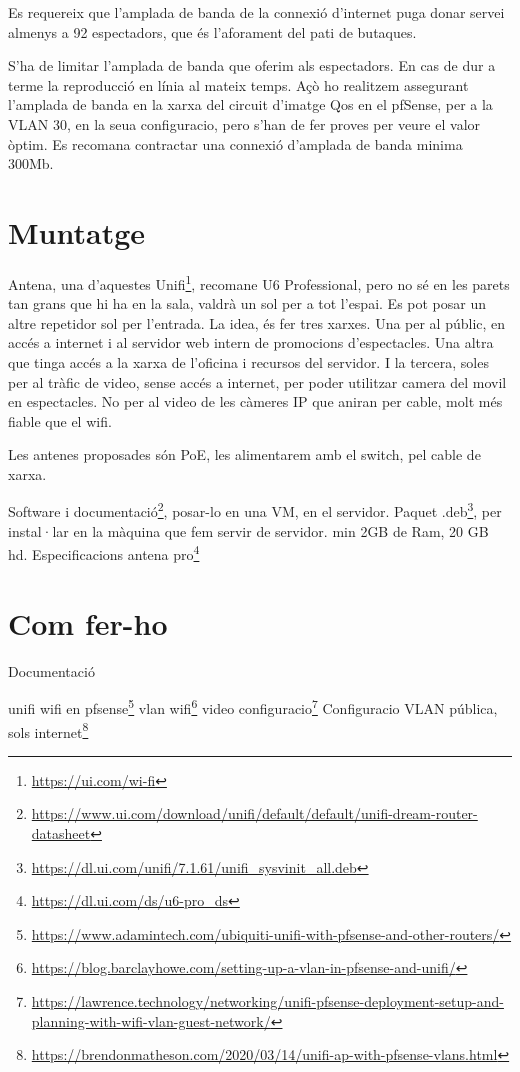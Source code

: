 \documentclass[
  10pt,
]{krantz}
\DeclareRobustCommand{\href}[2]{#2\footnote{\url{#1}}}
\begin{document}
Es requereix que l'amplada de banda de la connexió d'internet puga donar servei almenys a 92 espectadors, que és l'aforament del pati de butaques.

S'ha de limitar l'amplada de banda que oferim als espectadors. En cas de dur a terme la reproducció en línia al mateix temps. Açò ho realitzem assegurant l'amplada de banda en la xarxa del circuit d'imatge Qos en el pfSense, per a la VLAN 30, en la seua configuracio, pero s'han de fer proves per veure el valor òptim. Es recomana contractar una connexió d'amplada de banda minima 300Mb.

\hypertarget{muntatge}{%
\section{Muntatge}\label{muntatge}}

Antena, una d'aquestes \href{https://ui.com/wi-fi}{Unifi}, recomane U6 Professional, pero no sé en les parets tan grans que hi ha en la sala, valdrà un sol per a tot l'espai. Es pot posar un altre repetidor sol per l'entrada. La idea, és fer tres xarxes. Una per al públic, en accés a internet i al servidor web intern de promocions d'espectacles. Una altra que tinga accés a la xarxa de l'oficina i recursos del servidor. I la tercera, soles per al tràfic de video, sense accés a internet, per poder utilitzar camera del movil en espectacles. No per al video de les càmeres IP que aniran per cable, molt més fiable que el wifi.

Les antenes proposades són PoE, les alimentarem amb el switch, pel cable de xarxa.

\href{https://www.ui.com/download/unifi/default/default/unifi-dream-router-datasheet}{Software i documentació}, posar-lo en una VM, en el servidor. \href{https://dl.ui.com/unifi/7.1.61/unifi_sysvinit_all.deb}{Paquet .deb}, per instal·lar en la màquina que fem servir de servidor. min 2GB de Ram, 20 GB hd. \href{https://dl.ui.com/ds/u6-pro_ds}{Especificacions antena pro}

\hypertarget{com-fer-ho}{%
\section{Com fer-ho}\label{com-fer-ho}}

Documentació

\href{https://www.adamintech.com/ubiquiti-unifi-with-pfsense-and-other-routers/}{unifi wifi en pfsense} \href{https://blog.barclayhowe.com/setting-up-a-vlan-in-pfsense-and-unifi/}{vlan wifi} \href{https://lawrence.technology/networking/unifi-pfsense-deployment-setup-and-planning-with-wifi-vlan-guest-network/}{video configuracio} \href{https://brendonmatheson.com/2020/03/14/unifi-ap-with-pfsense-vlans.html}{Configuracio VLAN pública, sols internet}
\end{document}
